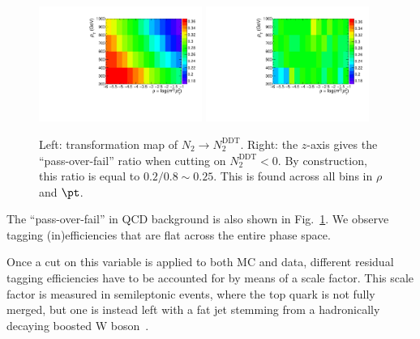 \begin{figure}
  \centering
  \includegraphics[width=0.475\textwidth]{figures/higgstagging/n2ddt/h2ddt.pdf}
  \includegraphics[width=0.475\textwidth]{figures/higgstagging/n2ddt/h2_rhoVpt_pafa.pdf}\\
  \caption{Left: transformation map of $N_2\rightarrow N_2^{\text{DDT}}$. Right: the $z$-axis gives the ``pass-over-fail'' ratio when cutting on $N_2^\text{DDT}<0$. By construction, this ratio is equal to $0.2/0.8\sim0.25$. This is found across all bins in $\rho$ and $\pt$.}
  \label{fig:transmap_20percent}
\end{figure}

The ``pass-over-fail'' in QCD background is also shown in Fig.~\ref{fig:transmap_20percent}. We observe tagging (in)efficiencies that are flat across the entire phase space. 


Once a cut on this variable is applied to both MC and data, different residual tagging efficiencies have to be accounted for by means of a scale factor. This scale factor is measured in semileptonic \ttbar events, where the top quark is not fully merged, but one is instead left with a fat jet stemming from a hadronically decaying boosted W boson~\cite{CMS_AN_2016-219}.



